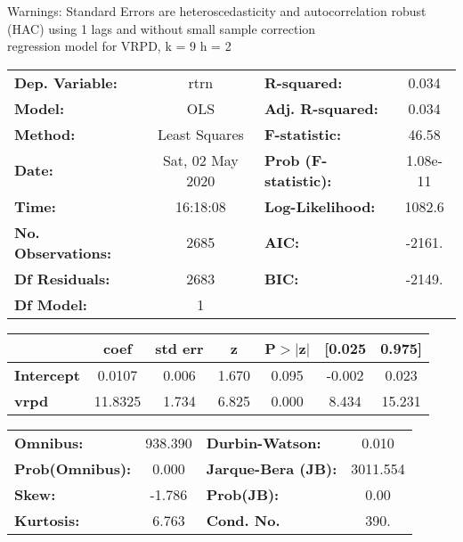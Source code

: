 Warnings: \newline
 [1] Standard Errors are heteroscedasticity and autocorrelation robust (HAC) using 1 lags and without small sample correction\\ 

regression model for VRPD, k = 9 h = 2\begin{center}
\begin{tabular}{lclc}
\toprule
\textbf{Dep. Variable:}    &       rtrn       & \textbf{  R-squared:         } &     0.034   \\
\textbf{Model:}            &       OLS        & \textbf{  Adj. R-squared:    } &     0.034   \\
\textbf{Method:}           &  Least Squares   & \textbf{  F-statistic:       } &     46.58   \\
\textbf{Date:}             & Sat, 02 May 2020 & \textbf{  Prob (F-statistic):} &  1.08e-11   \\
\textbf{Time:}             &     16:18:08     & \textbf{  Log-Likelihood:    } &    1082.6   \\
\textbf{No. Observations:} &        2685      & \textbf{  AIC:               } &    -2161.   \\
\textbf{Df Residuals:}     &        2683      & \textbf{  BIC:               } &    -2149.   \\
\textbf{Df Model:}         &           1      & \textbf{                     } &             \\
\bottomrule
\end{tabular}
\begin{tabular}{lcccccc}
                   & \textbf{coef} & \textbf{std err} & \textbf{z} & \textbf{P$> |$z$|$} & \textbf{[0.025} & \textbf{0.975]}  \\
\midrule
\textbf{Intercept} &       0.0107  &        0.006     &     1.670  &         0.095        &       -0.002    &        0.023     \\
\textbf{vrpd}      &      11.8325  &        1.734     &     6.825  &         0.000        &        8.434    &       15.231     \\
\bottomrule
\end{tabular}
\begin{tabular}{lclc}
\textbf{Omnibus:}       & 938.390 & \textbf{  Durbin-Watson:     } &    0.010  \\
\textbf{Prob(Omnibus):} &   0.000 & \textbf{  Jarque-Bera (JB):  } & 3011.554  \\
\textbf{Skew:}          &  -1.786 & \textbf{  Prob(JB):          } &     0.00  \\
\textbf{Kurtosis:}      &   6.763 & \textbf{  Cond. No.          } &     390.  \\
\bottomrule
\end{tabular}
\end{center}

